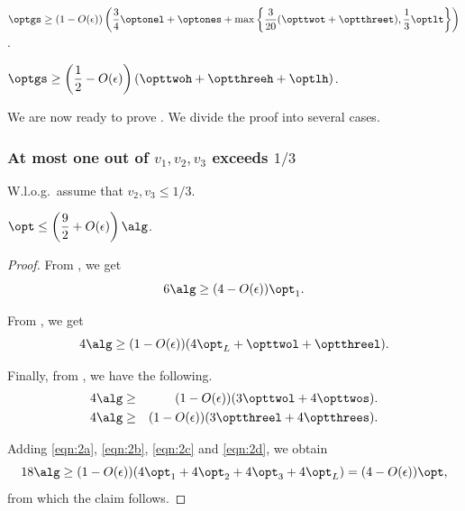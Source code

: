 \begin{corollary}
\label{cor:combinepacking}
    $\displaystyle\optgs \ge (1-O(\epsilon))\left(\frac{3}{4}\optonel+\optones+\max\left\{\frac{3}{20}(\opttwot+\optthreet),\frac{1}{3}\optlt\right\}\right)$.
\end{corollary}


\begin{corollary}
\label{cor:2dknapsackcontainer}
    $\displaystyle\optgs \ge \left(\frac{1}{2}-O(\epsilon)\right)(\opttwoh+\optthreeh+\optlh)$.
\end{corollary}

We are now ready to prove . We divide the proof into several cases. 

\subsubsection{At most one out of \texorpdfstring{$v_1,v_2,v_3$}{v1, v2, v3} exceeds \texorpdfstring{$1/3$}{1/3}}
W.l.o.g.~assume that $v_2,v_3 \le 1/3$.

\begin{claim}
\label{cla:9by2}
    $\displaystyle\opt \le \left(\frac{9}{2}+O(\epsilon)\right)\alg$.
\end{claim}
\begin{proof}
    From , we get 
    \begin{equation}
    \label{eqn:2a}
        6\alg \ge (4-O(\epsilon))\opt_1.
    \end{equation}

    From , we get
    \begin{equation}
    \label{eqn:2b}
        4\alg \ge (1-O(\epsilon))(4\opt_L + \opttwol+\optthreel).
    \end{equation}

    Finally, from , we have the following.
    \begin{eqnarray}
        4\alg &\ge& (1-O(\epsilon))(3\opttwol + 4\opttwos).    \label{eqn:2c}\\
        4\alg &\ge& (1-O(\epsilon))(3\optthreel + 4\optthrees).    \label{eqn:2d}
    \end{eqnarray}

    Adding \eqref{eqn:2a}, \eqref{eqn:2b}, \eqref{eqn:2c} and \eqref{eqn:2d}, we obtain
    \[ 18\alg \ge (1-O(\epsilon))(4\opt_1 + 4\opt_2 + 4\opt_3 + 4\opt_L) = (4-O(\epsilon))\opt,\]
    from which the claim follows.
\end{proof}






